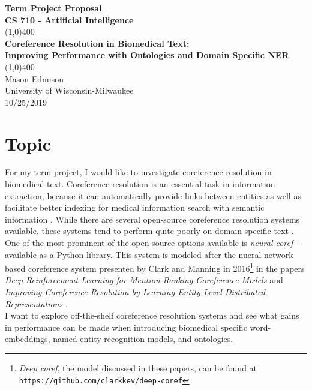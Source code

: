 \documentclass[11pt]{article}
\begin{document}
\begin{titlepage}
\begin{center}
\Large{\textbf{Term Project Proposal}} \\
\Large{\textbf{CS 710 - Artificial Intelligence}} \\

\vfill
\line(1,0){400} \\

\Large{\textbf{Coreference Resolution in Biomedical Text:}} \\
\Large{\textbf{Improving Performance with Ontologies and Domain Specific NER}} \\

\line(1,0){400}\\
\vfill
Mason Edmison\\
University of Wisconsin-Milwaukee\\
10/25/2019
\end{center}
\end{titlepage}

\section{Topic}
For my term project, I would like to investigate coreference resolution in biomedical text. Coreference resolution is an essential task in information extraction, because it can automatically provide links between entities as well as facilitate better indexing for medical information search with semantic information \cite{choi-etal-2014-analysis}. While there are several open-source coreference resolution systems available, these systems tend to perform quite poorly on domain specific-text \cite{choi-etal-2014-analysis}. One of the most prominent of the open-source options available is \emph{neural coref} - available as a Python library. This system is modeled after the nueral network based coreference system presented by Clark and Manning in 2016\footnote{\emph{Deep coref}, the model discussed in these papers, can be found at \texttt{https://github.com/clarkkev/deep-coref}} in the papers \emph{Deep Reinforcement Learning for Mention-Ranking Coreference Models} \cite{clark-manning-2016-deep} and \emph{Improving Coreference Resolution by Learning Entity-Level Distributed Representations} \cite{clark-manning-2016-improving}. \\

I want to explore off-the-shelf coreference resolution systems and see what gains in performance can be made when introducing biomedical specific word-embeddings, named-entity recognition models, and ontologies.
\end{document}
